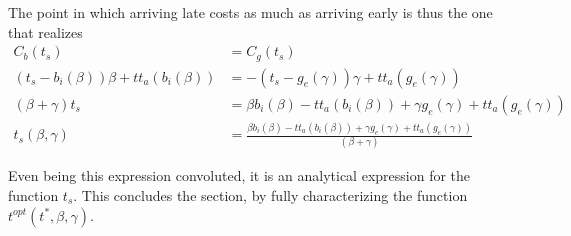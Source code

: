 The point in which arriving late costs as much as arriving early is thus the one that realizes
\begin{equation}
  \label{eq:t_s_numbers}
  \begin{split}
    C_b(t_s) & = C_g(t_s) \\
    (t_s - b_i(\beta))\beta + tt_a(b_i(\beta)) & = -(t_s - g_e(\gamma))\gamma + tt_a(g_e(\gamma)) \\
    (\beta + \gamma)t_s & = \beta b_i(\beta) - tt_a(b_i(\beta)) + \gamma g_e(\gamma) + tt_a(g_e(\gamma)) \\
    t_s(\beta, \gamma) & = \frac{\beta b_i(\beta) - tt_a(b_i(\beta)) + \gamma g_e(\gamma) + tt_a(g_e(\gamma))}{(\beta + \gamma)}
  \end{split}
\end{equation}

Even being this expression convoluted, it is an analytical expression for the function \(t_s\).
This concludes the section, by fully characterizing the function \(t^{opt}(t^*, \beta, \gamma)\).

